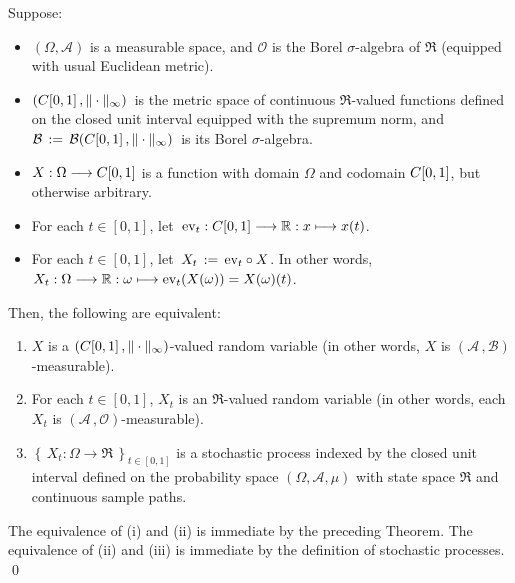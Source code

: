 \vskip 0.8cm
\begin{theorem}
\mbox{}\vskip 0.1cm
\noindent
Suppose:
\begin{itemize}
\item	$\left(\Omega,\mathcal{A}\right)$ is a measurable space, and
		$\mathcal{O}$ is the Borel $\sigma$-algebra of $\Re$ (equipped with usual Euclidean metric).
\item	$(C[0,1]\,,\Vert\cdot\Vert_{\infty})$\, is the metric space
		of continuous $\Re$-valued functions defined on the closed unit interval
		equipped with the supremum norm, and
		\,$\mathcal{B} \,:=\, \mathcal{B}(C[0,1]\,,\Vert\cdot\Vert_{\infty})$\, is its Borel $\sigma$-algebra.
\item	$X : \Omega \longrightarrow C[0,1]$ is a function with domain $\Omega$
		and codomain $C[0,1]$, but otherwise arbitrary.
\item	For each $t \in [0,1]$, let \,$\textnormal{ev}_{t} : C[0,1] \longrightarrow \mathbb{R} : x \longmapsto x(t)$.
\item 	For each $t \in [0,1]$, let \,$X_{t} \,:=\, \textnormal{ev}_{t} \circ X$.
		In other words, $X_{t} : \Omega \longrightarrow \mathbb{R} : \omega \longmapsto \textnormal{ev}_{t}(X(\omega)) = X(\omega)(t)$.
\end{itemize}
Then, the following are equivalent:
\begin{enumerate}
\item	$X$ is a $(C[0,1]\,,\Vert\cdot\Vert_{\infty})$-valued random variable
		(in other words, $X$ is $(\mathcal{A}\,,\mathcal{B})$-measurable).
\item	For each $t \in [0,1]$, $X_{t}$ is an $\Re$-valued random variable
		(in other words, each $X_{t}$ is $(\mathcal{A}\,,\mathcal{O})$-measurable).
\item	$\left\{\,X_{t}:\Omega\longrightarrow\Re\,\right\}_{t\in[0,1]}$ is a stochastic process
		indexed by the closed unit interval
		defined on the probability space $\left(\Omega,\mathcal{A},\mu\right)$
		with state space $\Re$ and continuous sample paths.
\end{enumerate}
\end{theorem}
\proof
The equivalence of (i) and (ii) is immediate by the preceding Theorem.
The equivalence of (ii) and (iii) is immediate by the definition of stochastic processes.
\qed


\renewcommand{\theenumi}{\roman{enumi}}
\renewcommand{\labelenumi}{\textnormal{(\theenumi)}$\;\;$}

